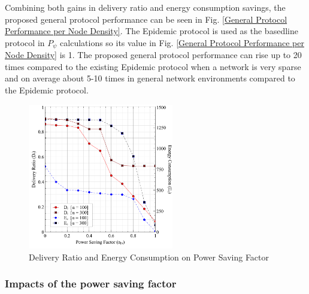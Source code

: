 \documentclass[conference]{IEEEtran}
\begin{document}
Combining both gains in delivery ratio and energy consumption savings, the proposed general protocol performance can be seen in Fig. \ref{General Protocol Performance per Node Density}. 
%
The Epidemic protocol is used as the basedline protocol in $P_{\psi}$ calculations so its value in Fig. \ref{General Protocol Performance per Node Density} is 1.
%
The proposed general protocol performance can rise up to 20 times compared to the existing Epidemic protocol when a network is very sparse and on average about 5-10 times in general network environments compared to the Epidemic protocol.

\begin{figure}[!t]
\centering
\includegraphics[width=2.5in]{Graphs/NpsDeliveryPerformanceAndDeliveryRatio.pdf}
\caption{Delivery Ratio and Energy Consumption on Power Saving Factor}
\label{The Optimum between Delivery Ratio and protocol Performance}
\end{figure}

\subsubsection{Impacts of the power saving factor}
\end{document}
